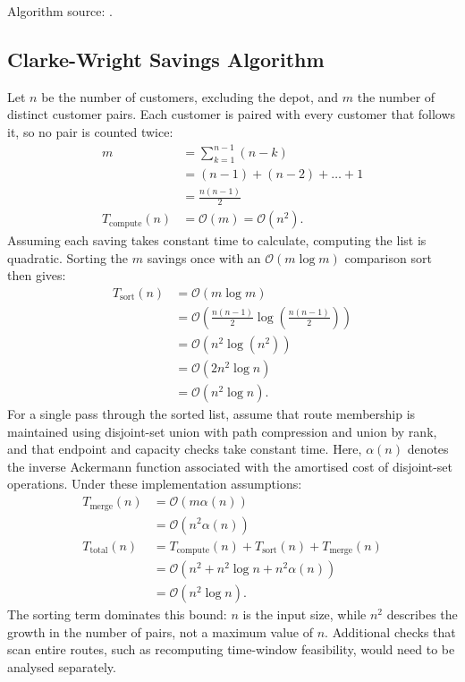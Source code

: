 \documentclass[11pt]{article}
\begin{document}
\begin{appendices}
Algorithm source: \textcite{Rosenkrantz1977}.

\subsection{Clarke-Wright Savings Algorithm}
\label{app:complexity_savings}
Let $n$ be the number of customers, excluding the depot, and $m$ the number of distinct customer pairs. Each customer is paired with every customer that follows it, so no pair is counted twice:
\[
\begin{aligned}
    m &= \sum_{k=1}^{n-1} (n-k) \\
      &= (n-1)+(n-2)+\dots+1 \\
      &= \frac{n(n-1)}{2} \\[0.5em]
    T_{\text{compute}}(n) &= \mathcal{O}(m)=\mathcal{O}(n^2).
\end{aligned}
\]
Assuming each saving takes constant time to calculate, computing the list is quadratic. Sorting the $m$ savings once with an $\mathcal{O}(m\log m)$ comparison sort then gives:
\[
\begin{aligned}
    T_{\text{sort}}(n) &= \mathcal{O}(m\log m) \\
    &= \mathcal{O}\!\left(\frac{n(n-1)}{2}\log\!\left(\frac{n(n-1)}{2}\right)\right) \\
    &= \mathcal{O}(n^2\log(n^2)) \\
    &= \mathcal{O}(2n^2\log n) \\
    &= \mathcal{O}(n^2\log n).
\end{aligned}
\]
For a single pass through the sorted list, assume that route membership is maintained using disjoint-set union with path compression and union by rank, and that endpoint and capacity checks take constant time. Here, $\alpha(n)$ denotes the inverse Ackermann function associated with the amortised cost of disjoint-set operations. Under these implementation assumptions:
\[
\begin{aligned}
    T_{\text{merge}}(n) &= \mathcal{O}(m\alpha(n)) \\
    &= \mathcal{O}(n^2\alpha(n)) \\[0.5em]
    T_{\text{total}}(n) &= T_{\text{compute}}(n)+T_{\text{sort}}(n)+T_{\text{merge}}(n) \\
    &= \mathcal{O}(n^2+n^2\log n+n^2\alpha(n)) \\
    &= \mathcal{O}(n^2\log n).
\end{aligned}
\]
The sorting term dominates this bound: $n$ is the input size, while $n^2$ describes the growth in the number of pairs, not a maximum value of $n$. Additional checks that scan entire routes, such as recomputing time-window feasibility, would need to be analysed separately.


\end{appendices}
\end{document}
